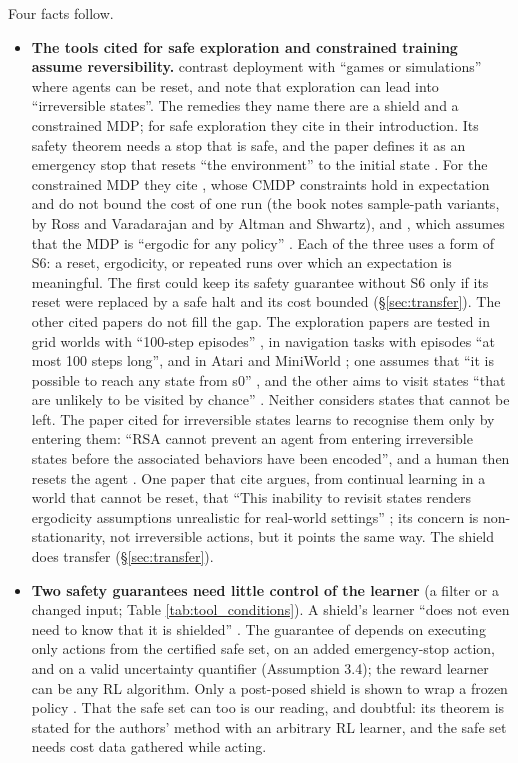\documentclass{article}
\providecommand{\tightlist}{\setlength{\itemsep}{0pt}\setlength{\parskip}{0pt}}
\begin{document}
Four facts follow.

\begin{itemize}
\tightlist
\item
  \textbf{The tools cited for safe exploration and constrained training assume reversibility.} \citet[§3.6.2]{mclean2026} contrast deployment with ``games or simulations'' where agents can be reset, and note that exploration can lead into ``irreversible states''. The remedies they name there are a shield and a constrained MDP; for safe exploration they cite \citet{wachi2023} in their introduction. Its safety theorem needs a stop that is safe, and the paper defines it as an emergency stop that resets ``the environment'' to the initial state \citep[Assumption 3.3]{wachi2023}. For the constrained MDP they cite \citet{altman1999}, whose CMDP constraints hold in expectation and do not bound the cost of one run (the book notes sample-path variants, by Ross and Varadarajan and by Altman and Shwartz), and \citet{satija2020}, which assumes that the MDP is ``ergodic for any policy'' \citep[Assumption 3.1]{satija2020}. Each of the three uses a form of S6: a reset, ergodicity, or repeated runs over which an expectation is meaningful. The first could keep its safety guarantee without S6 only if its reset were replaced by a safe halt and its cost bounded (§\ref{sec:transfer}). The other cited papers do not fill the gap. The exploration papers are tested in grid worlds with ``100-step episodes'' \citep{tse2025}, in navigation tasks with episodes ``at most 100 steps long'', and in Atari and MiniWorld \citep{klissarov2023}; one assumes that ``it is possible to reach any state from s0'' \citep[Assumption C.1]{tse2025}, and the other aims to visit states ``that are unlikely to be visited by chance'' \citep{klissarov2023}. Neither considers states that cannot be left. The paper cited for irreversible states learns to recognise them only by entering them: ``RSA cannot prevent an agent from entering irreversible states before the associated behaviors have been encoded'', and a human then resets the agent \citep{lee2025}. One paper that \citet{mclean2026} cite argues, from continual learning in a world that cannot be reset, that ``This inability to revisit states renders ergodicity assumptions unrealistic for real-world settings'' \citep{elelimy2025}; its concern is non-stationarity, not irreversible actions, but it points the same way. The shield does transfer (§\ref{sec:transfer}).
\item
  \textbf{Two safety guarantees need little control of the learner} (a filter or a changed input; Table \ref{tab:tool_conditions}). A shield's learner ``does not even need to know that it is shielded'' \citep{alshiekh2018}. The guarantee of \citet{wachi2023} depends on executing only actions from the certified safe set, on an added emergency-stop action, and on a valid uncertainty quantifier (Assumption 3.4); the reward learner can be any RL algorithm. Only a post-posed shield is shown to wrap a frozen policy \citep{alshiekh2018}. That the safe set can too is our reading, and doubtful: its theorem is stated for the authors' method with an arbitrary RL learner, and the safe set needs cost data gathered while acting.

\end{itemize}
\end{document}
